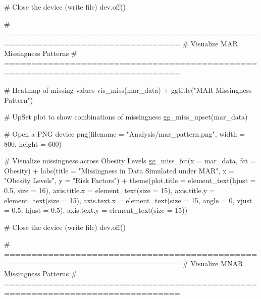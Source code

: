 \documentclass[
  letterpaper,
  DIV=11,
  numbers=noendperiod]{scrartcl}
\newenvironment{Shaded}{\begin{snugshade}}{\end{snugshade}}
\newcommand{\AttributeTok}[1]{\textcolor[rgb]{0.40,0.45,0.13}{#1}}
\newcommand{\CommentTok}[1]{\textcolor[rgb]{0.37,0.37,0.37}{#1}}
\newcommand{\DecValTok}[1]{\textcolor[rgb]{0.68,0.00,0.00}{#1}}
\newcommand{\FloatTok}[1]{\textcolor[rgb]{0.68,0.00,0.00}{#1}}
\newcommand{\FunctionTok}[1]{\textcolor[rgb]{0.28,0.35,0.67}{#1}}
\newcommand{\NormalTok}[1]{\textcolor[rgb]{0.00,0.23,0.31}{#1}}
\newcommand{\SpecialCharTok}[1]{\textcolor[rgb]{0.37,0.37,0.37}{#1}}
\newcommand{\StringTok}[1]{\textcolor[rgb]{0.13,0.47,0.30}{#1}}
\begin{document}
\begin{Shaded}
\begin{Highlighting}[]
\CommentTok{\# Close the device (write file)}
\FunctionTok{dev.off}\NormalTok{()}

\CommentTok{\# ==============================================================================}
\CommentTok{\# Visualize MAR Missingness Patterns}
\CommentTok{\# ==============================================================================}

\CommentTok{\# Heatmap of missing values}
\FunctionTok{vis\_miss}\NormalTok{(mar\_data) }\SpecialCharTok{+} \FunctionTok{ggtitle}\NormalTok{(}\StringTok{"MAR Missingness Pattern"}\NormalTok{)}

\CommentTok{\# UpSet plot to show combinations of missingness}
\FunctionTok{gg\_miss\_upset}\NormalTok{(mar\_data) }

\CommentTok{\# Open a PNG device}
\FunctionTok{png}\NormalTok{(}\AttributeTok{filename =} \StringTok{"Analysis/mar\_pattern.png"}\NormalTok{, }\AttributeTok{width =} \DecValTok{800}\NormalTok{, }\AttributeTok{height =} \DecValTok{600}\NormalTok{)}

\CommentTok{\# Visualize missingness across Obesity Levels}
\FunctionTok{gg\_miss\_fct}\NormalTok{(}\AttributeTok{x =}\NormalTok{ mar\_data, }\AttributeTok{fct =}\NormalTok{ Obesity) }\SpecialCharTok{+} 
  \FunctionTok{labs}\NormalTok{(}\AttributeTok{title =} \StringTok{"Missingness in Data Simulated under MAR"}\NormalTok{,}
       \AttributeTok{x =} \StringTok{"Obesity Levels"}\NormalTok{, }\AttributeTok{y =} \StringTok{"Risk Factors"}\NormalTok{) }\SpecialCharTok{+}
\FunctionTok{theme}\NormalTok{(}\AttributeTok{plot.title =} \FunctionTok{element\_text}\NormalTok{(}\AttributeTok{hjust =} \FloatTok{0.5}\NormalTok{, }\AttributeTok{size =} \DecValTok{16}\NormalTok{),}
    \AttributeTok{axis.title.x =} \FunctionTok{element\_text}\NormalTok{(}\AttributeTok{size =} \DecValTok{15}\NormalTok{),}
    \AttributeTok{axis.title.y =} \FunctionTok{element\_text}\NormalTok{(}\AttributeTok{size =} \DecValTok{15}\NormalTok{),}
    \AttributeTok{axis.text.x =} \FunctionTok{element\_text}\NormalTok{(}\AttributeTok{size =} \DecValTok{15}\NormalTok{, }\AttributeTok{angle =} \DecValTok{0}\NormalTok{, }\AttributeTok{vjust =} \FloatTok{0.5}\NormalTok{, }\AttributeTok{hjust =} \FloatTok{0.5}\NormalTok{),}
    \AttributeTok{axis.text.y =} \FunctionTok{element\_text}\NormalTok{(}\AttributeTok{size =} \DecValTok{15}\NormalTok{))}

\CommentTok{\# Close the device (write file)}
\FunctionTok{dev.off}\NormalTok{()}

\CommentTok{\# ==============================================================================}
\CommentTok{\# Visualize MNAR Missingness Patterns}
\CommentTok{\# ==============================================================================}


\end{Highlighting}
\end{Shaded}
\end{document}
